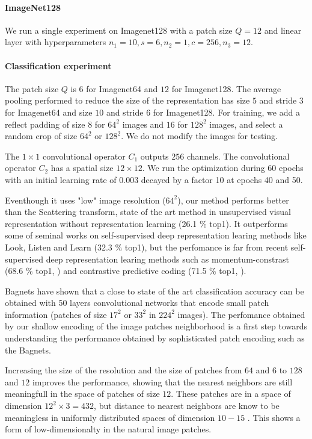 \documentclass{article}
\begin{document}
{\paragraph{ImageNet128}
We run a single experiment on Imagenet128 with a patch size $Q=12$ and  linear layer with  hyperparameters  $n_1=10,s=6, n_2=1, c=256, n_3=12$.


\paragraph{Classification experiment}
The patch size $Q$ is $6$ for Imagenet64 and $12$ for Imagenet128.
The average pooling performed to reduce the size of the representation has  size $5$ and stride $3$ for Imagenet64 and size $10$ and stride $6$ for Imagenet128.
For training, we add a reflect padding of size $8$ for $64^2$ images and $16$ for $128^2$ images, and select a random crop of size $64^2$ or $128^2$.
We do not  modify the images for testing.


The $1 \times 1$ convolutional operator $C_1$ outputs $256$ channels.
The convolutional operator $C_2$ has a spatial size $12 \times 12$.
We run the optimization during 60 epochs with an initial learning rate of 0.003 decayed by a factor 10 at epochs 40 and 50.

Eventhough it uses "low" image resolution ($64^2$), our method performs better than the  Scattering transform, state of the art method in unsupervised visual representation without representation learning (26.1 \% top1).
It outperforms some of seminal works on self-supervised deep representation learing methods like Look, Listen and Learn \citep{arandjelovic2017look} (32.3 \% top1), but the perfomance is far from recent self-supervised deep representation learing methods such as momentum-constrast (68.6 \% top1, \citep{he2019momentum} ) and contrastive predictive coding (71.5 \% top1, \citep{henaff2019data}).

Bagnets \citep{brendel2019approximating} have shown that a close to state of the art classification accuracy can be obtained with 50 layers convolutional networks that encode small patch information (patches of size $17^2$ or $33^2$ in $224^2$ images).
The perfomance obtained by our shallow encoding of the image patches neighborhood is a first step towards understanding the performance obtained by sophisticated patch encoding such as the Bagnets.
 
Increasing the size of the resolution and the size of patches from $64$ and $6$ to $128$ and $12$ improves the performance, showing that the nearest neighbors are still meaningfull in the space of patches of size $12$.
These patches are in a space of dimension $12^2 \times 3 = 432$, but distance to nearest neighbors are know to be meaningless in uniformly distributed spaces of dimension $10 -15$ \citep{beyer1999nearest}.
This shows a form of low-dimensionalty in the natural image patches.


}
\end{document}
